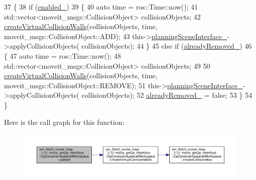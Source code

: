 \begin{DoxyCode}
37         \{
38             \textcolor{keywordflow}{if} (\hyperlink{classsm__fetch__screw__loop__1_1_1cl__move__group__interface_1_1CpConstraintLateralWorkspace_a28b477967db7dd372abf9ab95675130e}{enabled\_})
39             \{
40                 \textcolor{keyword}{auto} time = ros::Time::now();
41                 std::vector<moveit\_msgs::CollisionObject> collisionObjects;
42                 \hyperlink{classsm__fetch__screw__loop__1_1_1cl__move__group__interface_1_1CpConstraintLateralWorkspace_a090af6376b13560ccbbb7332ebb0b003}{createVirtualCollisionWalls}(collisionObjects, time, 
      moveit\_msgs::CollisionObject::ADD);
43                 this->\hyperlink{classsm__fetch__screw__loop__1_1_1cl__move__group__interface_1_1CpConstraintLateralWorkspace_abf0b9ad04e9a615b215cc8841888696e}{planningSceneInterface\_}->applyCollisionObjects(
      collisionObjects);
44             \}
45             \textcolor{keywordflow}{else} \textcolor{keywordflow}{if} (\hyperlink{classsm__fetch__screw__loop__1_1_1cl__move__group__interface_1_1CpConstraintLateralWorkspace_a349bfead18a56cdbca6137926694e409}{alreadyRemoved\_})
46             \{
47                 \textcolor{keyword}{auto} time = ros::Time::now();
48                 std::vector<moveit\_msgs::CollisionObject> collisionObjects;
49 
50                 \hyperlink{classsm__fetch__screw__loop__1_1_1cl__move__group__interface_1_1CpConstraintLateralWorkspace_a090af6376b13560ccbbb7332ebb0b003}{createVirtualCollisionWalls}(collisionObjects, time, 
      moveit\_msgs::CollisionObject::REMOVE);
51                 this->\hyperlink{classsm__fetch__screw__loop__1_1_1cl__move__group__interface_1_1CpConstraintLateralWorkspace_abf0b9ad04e9a615b215cc8841888696e}{planningSceneInterface\_}->applyCollisionObjects(
      collisionObjects);
52                 \hyperlink{classsm__fetch__screw__loop__1_1_1cl__move__group__interface_1_1CpConstraintLateralWorkspace_a349bfead18a56cdbca6137926694e409}{alreadyRemoved\_} = \textcolor{keyword}{false};
53             \}
54         \}
\end{DoxyCode}
Here is the call graph for this function\+:
\nopagebreak
\begin{figure}[H]
\begin{center}
\leavevmode
\includegraphics[width=350pt]{classsm__fetch__screw__loop__1_1_1cl__move__group__interface_1_1CpConstraintLateralWorkspace_a42a932b985fa0e4f9f48e52b363bf6c2_cgraph}
\end{center}
\end{figure}
